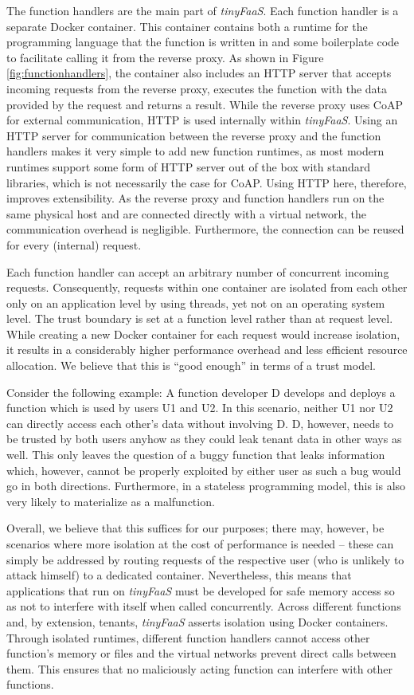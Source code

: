 The function handlers are the main part of \textit{tinyFaaS}.
Each function handler is a separate Docker container.
This container contains both a runtime for the programming language that the function is written in and some boilerplate code to facilitate calling it from the reverse proxy.
As shown in Figure \ref{fig:functionhandlers}, the container also includes an HTTP server that accepts incoming requests from the reverse proxy, executes the function with the data provided by the request and returns a result.
While the reverse proxy uses CoAP for external communication, HTTP is used internally within \textit{tinyFaaS}.
Using an HTTP server for communication between the reverse proxy and the function handlers makes it very simple to add new function runtimes, as most modern runtimes support some form of HTTP server out of the box with standard libraries, which is not necessarily the case for CoAP.
Using HTTP here, therefore, improves extensibility.
As the reverse proxy and function handlers run on the same physical host and are connected directly with a virtual network, the communication overhead is negligible.
Furthermore, the connection can be reused for every (internal) request.

Each function handler can accept an arbitrary number of concurrent incoming requests.
Consequently, requests within one container are isolated from each other only on an application level by using threads, yet not on an operating system level.
The trust boundary is set at a function level rather than at request level.
While creating a new Docker container for each request would increase isolation, it results in a considerably higher performance overhead and less efficient resource allocation.
We believe that this is ``good enough'' in terms of a trust model.

Consider the following example: A function developer D develops and deploys a function which is used by users U1 and U2.
In this scenario, neither U1 nor U2 can directly access each other's data without involving D.
D, however, needs to be trusted by both users anyhow as they could leak tenant data in other ways as well.
This only leaves the question of a buggy function that leaks information which, however, cannot be properly exploited by either user as such a bug would go in both directions.
Furthermore, in a stateless programming model, this is also very likely to materialize as a malfunction.

Overall, we believe that this suffices for our purposes; there may, however, be scenarios where more isolation at the cost of performance is needed -- these can simply be addressed by routing requests of the respective user (who is unlikely to attack himself) to a dedicated container.
Nevertheless, this means that applications that run on \textit{tinyFaaS} must be developed for safe memory access so as not to interfere with itself when called concurrently.
Across different functions and, by extension, tenants, \textit{tinyFaaS} asserts isolation using Docker containers.
Through isolated runtimes, different function handlers cannot access other function's memory or files and the virtual networks prevent direct calls between them.
This ensures that no maliciously acting function can interfere with other functions.

